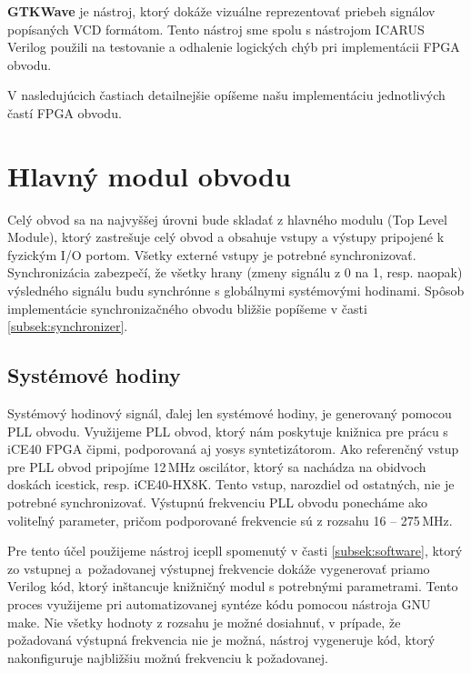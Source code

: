 \textbf{GTKWave} \cite{gtkwave} je nástroj, ktorý dokáže vizuálne reprezentovať priebeh signálov popísaných VCD formátom. Tento nástroj sme spolu s nástrojom ICARUS Verilog použili na testovanie a odhalenie logických chýb pri implementácii FPGA obvodu.

V nasledujúcich častiach detailnejšie opíšeme našu implementáciu jednotlivých častí FPGA obvodu.

\section{Hlavný modul obvodu}\label{sek:topLevelModule}
Celý obvod sa na najvyššej úrovni bude skladať z hlavného modulu (Top Level Module), ktorý zastrešuje celý obvod a obsahuje vstupy a výstupy pripojené k fyzickým I/O portom. Všetky externé vstupy je potrebné synchronizovať. Synchronizácia zabezpečí, že všetky hrany (zmeny signálu z 0 na 1, resp. naopak) výsledného signálu budu synchrónne s globálnymi systémovými hodinami. Spôsob implementácie synchronizačného obvodu bližšie popíšeme v časti \ref{subsek:synchronizer}.

\subsection{Systémové hodiny}
Systémový hodinový signál, ďalej len systémové hodiny, je generovaný pomocou PLL obvodu. Využijeme PLL obvod, ktorý nám poskytuje knižnica pre prácu s iCE40 FPGA čipmi, podporovaná aj yosys syntetizátorom. Ako referenčný vstup pre PLL obvod pripojíme 12\,MHz oscilátor, ktorý sa nachádza na obidvoch doskách icestick, resp. iCE40-HX8K. Tento vstup, narozdiel od ostatných, nie je potrebné synchronizovať. Výstupnú frekvenciu PLL obvodu ponecháme ako voliteľný parameter, pričom podporované frekvencie sú z rozsahu 16 -- 275\,MHz.

Pre tento účel použijeme nástroj icepll spomenutý v časti \ref{subsek:software}, ktorý zo vstupnej a~požadovanej výstupnej frekvencie dokáže vygenerovať priamo Verilog kód, ktorý inštancuje knižničný modul s potrebnými parametrami.
Tento proces využijeme pri automatizovanej syntéze kódu pomocou nástroja GNU make. Nie všetky hodnoty z rozsahu je možné dosiahnuť, v prípade, že požadovaná výstupná frekvencia nie je možná, nástroj vygeneruje kód, ktorý nakonfiguruje najbližšiu možnú frekvenciu k požadovanej.

